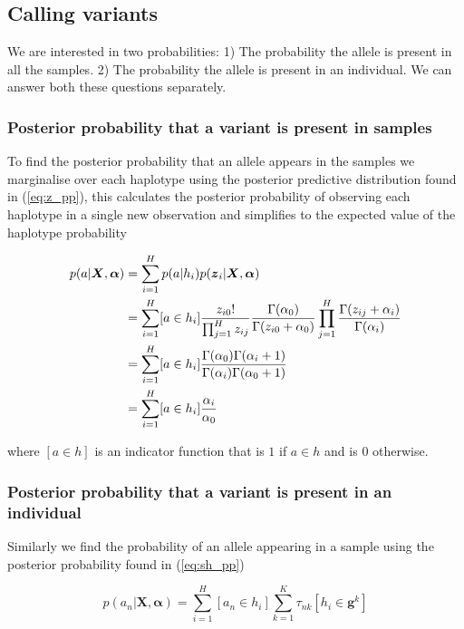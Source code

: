 \documentclass{article}
\begin{document}
\subsection{Calling variants}

We are interested in two probabilities: 1) The probability the allele is present in all the samples. 2) The probability the allele is present in an individual. We can answer both these questions separately.

\subsubsection{Posterior probability that a variant is present in samples}

To find the posterior probability that an allele appears in the samples we marginalise over each haplotype using the posterior predictive distribution found in (\ref{eq:z_pp}), this calculates the posterior probability of observing each haplotype in a single new observation and simplifies to the expected value of the haplotype probability

\begin{align}
    p(a | \boldsymbol{X}, \boldsymbol{\alpha}) &= \sum_{i = 1}^H p(a | h_i) p(\boldsymbol{z}_i | \boldsymbol{X}, \boldsymbol{\alpha}) \notag \\
    &= \sum_{i = 1}^H [a \in h_i] \frac{z_{i0}!}{\prod_{j = 1}^{H} z_{ij}} \frac{\Gamma(\alpha_0)}{\Gamma(z_{i0} + \alpha_0)} \prod_{j = 1}^H \frac{\Gamma(z_{ij} + \alpha_i)}{\Gamma(\alpha_i)} \notag \\
    &= \sum_{i = 1}^H [a \in h_i] \frac{\Gamma(\alpha_0)\Gamma(\alpha_i + 1)}{\Gamma(\alpha_i)\Gamma(\alpha_0 + 1)} \notag \\
    &= \sum_{i = 1}^H [a \in h_i] \frac{\alpha_i}{\alpha_0}
\end{align}

where $[a \in h]$ is an indicator function that is $1$ if $a \in h$ and is $0$ otherwise.

\subsubsection{Posterior probability that a variant is present in an individual}

Similarly we find the probability of an allele appearing in a sample using the posterior probability found in (\ref{eq:sh_pp})

\begin{equation}
\label{eq:sa_pp}
    p(a_n | \boldsymbol{X}, \boldsymbol{\alpha}) = \sum_{i = 1}^H [a_n \in h_i] \sum_{k = 1}^K \tau_{nk} [h_i \in \boldsymbol{g}^k]
\end{equation}
\end{document}
